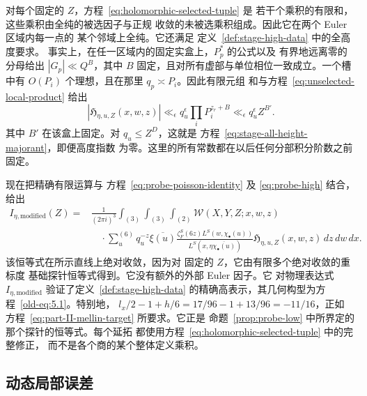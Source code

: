 \documentclass[11pt,a4paper]{article}
\numberwithin{equation}{section}
\numberwithin{figure}{section}
\theoremstyle{definition}
\theoremstyle{remark}
\begin{document}
对每个固定的 $Z$，方程~\eqref{eq:holomorphic-selected-tuple} 是
若干个乘积的有限和，这些乘积由全纯的被选因子与正规
收敛的未被选乘积组成。因此它在两个 Euler 区域内每一点的
某个邻域上全纯。它还满足
定义~\ref{def:stage-high-data} 中的全高度要求。
事实上，在任一区域内的固定实盒上，$P_p^*$ 的公式以及
有界地远离零的分母给出 $|G_p|\ll Q^B$，其中
$B$ 固定，且对所有虚部与单位相位一致成立。一个槽中有
$O(P_i)$ 个理想，且在那里 $q_p\asymp P_i$。因此有限元组
和与方程~\eqref{eq:unselected-local-product} 给出
\begin{equation}\label{eq:compensated-all-height-majorant}
 |\mathfrak H_{\eta,u,Z}(x,w,z)|
 \ll_\epsilon q_u^\epsilon\prod_iP_i^{z_r+B}
 \ll_\epsilon q_u^\epsilon Z^{B'}.
\end{equation}
其中 $B'$ 在该盒上固定。对 $q_u\le Z^D$，这就是
方程~\eqref{eq:stage-all-height-majorant}，即便高度指数
为零。这里的所有常数都在以后任何分部积分阶数之前
固定。

现在把精确有限运算与
方程~\eqref{eq:probe-poisson-identity} 及 \eqref{eq:probe-high}
结合，给出
\begin{equation}\label{eq:compensated-poisson-identity}
\begin{split}
 I_{\eta,\mathrm{modified}}(Z)
 ={}&\frac1{(2\pi i)^3}\int_{(3)}\int_{(3)}\int_{(2)}
       \mathcal W(X,Y,Z;x,w,z)\\
 &\quad\cdot\sum_u^{(6)}q_u^{-z}\overline{\xi(u)}
       \frac{\zeta_F^S(6z)L^S(w,\chi_\bullet(u))}
       {L^S(x,\eta\overline{\chi_\bullet(u)})}
       \mathfrak H_{\eta,u,Z}(x,w,z)\,dz\,dw\,dx.
\end{split}
\end{equation}
该恒等式在所示直线上绝对收敛，因为对
固定的 $Z$，它由有限多个绝对收敛的重标度
基础探针恒等式得到。它没有额外的外部 Euler 因子。它
对物理表达式 $I_{\eta,\mathrm{modified}}$ 验证了定义~\ref{def:stage-high-data}
的精确高表示，其几何构型为方程~\eqref{old-eq:5.1}。特别地，
$l_x/2-1+h/6=17/96-1+13/96=-11/16$，正如
方程~\eqref{eq:part-II-mellin-target} 所要求。它正是
命题~\ref{prop:probe-low} 中所界定的那个探针的恒等式。每个延拓
都使用方程~\eqref{eq:holomorphic-selected-tuple} 中的完整修正，
而不是各个商的某个整体定义乘积。

\subsection{动态局部误差}
\end{document}
